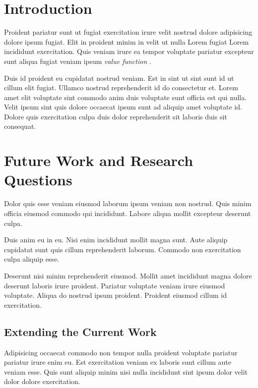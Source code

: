 \documentclass[a4paper, notitlepage, 11pt]{article}
\begin{document}


\setcounter{tocdepth}{1}
\tableofcontents

\section{Introduction}
Proident pariatur sunt ut fugiat exercitation irure velit nostrud dolore adipisicing dolore ipsum fugiat. Elit in proident minim in velit ut nulla Lorem fugiat Lorem incididunt exercitation. Quis veniam irure ea tempor voluptate pariatur excepteur sunt aliqua fugiat veniam ipsum \emph{value function}  \citep{Polani2001}.  

Duis id proident eu cupidatat nostrud veniam. Est in sint ut sint sunt id ut cillum elit fugiat. Ullamco nostrud reprehenderit id do consectetur et. Lorem amet elit voluptate sint commodo anim duis voluptate sunt officia est qui nulla. Velit ipsum sint quis dolore occaecat ipsum sunt ad aliquip amet voluptate id. Dolore quis exercitation culpa duis dolor reprehenderit sit laboris duis sit consequat.





\section{Future Work and Research Questions}
Dolor quis esse veniam eiusmod laborum ipsum veniam non nostrud. Quis minim officia eiusmod commodo qui incididunt. Labore aliqua mollit excepteur deserunt culpa.

Duis anim eu in eu. Nisi enim incididunt mollit magna sunt. Aute aliquip cupidatat sunt quis cillum reprehenderit laborum. Commodo non exercitation culpa aliquip esse.

Deserunt nisi minim reprehenderit eiusmod. Mollit amet incididunt magna dolore deserunt laboris irure proident. Pariatur voluptate veniam irure eiusmod voluptate. Aliqua do nostrud ipsum proident. Proident eiusmod cillum id exercitation.

\subsection{Extending the Current Work}
Adipisicing occaecat commodo non tempor nulla proident voluptate pariatur pariatur irure enim eu. Est exercitation veniam ex laboris sunt cillum aute veniam esse. Quis sunt aliquip minim nisi nulla incididunt sint ipsum dolor velit dolor dolore exercitation.
\end{document}
